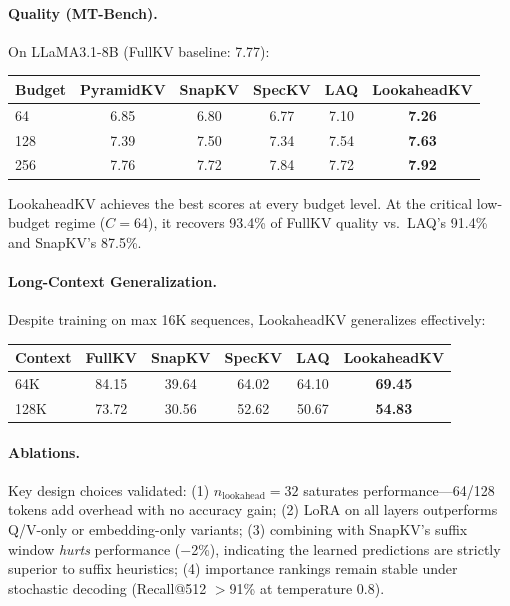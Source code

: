 \documentclass[11pt]{article}
\begin{document}
\paragraph{Quality (MT-Bench).}
On LLaMA3.1-8B (FullKV baseline: 7.77):

\begin{center}
\begin{tabular}{lccccc}
\toprule
\textbf{Budget} & \textbf{PyramidKV} & \textbf{SnapKV} & \textbf{SpecKV} & \textbf{LAQ} & \textbf{LookaheadKV} \\
\midrule
64 & 6.85 & 6.80 & 6.77 & 7.10 & \textbf{7.26} \\
128 & 7.39 & 7.50 & 7.34 & 7.54 & \textbf{7.63} \\
256 & 7.76 & 7.72 & 7.84 & 7.72 & \textbf{7.92} \\
\bottomrule
\end{tabular}
\end{center}

LookaheadKV achieves the best scores at every budget level. At the critical low-budget regime ($C\!=\!64$), it recovers 93.4\% of FullKV quality vs.\ LAQ's 91.4\% and SnapKV's 87.5\%.

\paragraph{Long-Context Generalization.}
Despite training on max 16K sequences, LookaheadKV generalizes effectively:

\begin{center}
\begin{tabular}{lccccc}
\toprule
\textbf{Context} & \textbf{FullKV} & \textbf{SnapKV} & \textbf{SpecKV} & \textbf{LAQ} & \textbf{LookaheadKV} \\
\midrule
64K & 84.15 & 39.64 & 64.02 & 64.10 & \textbf{69.45} \\
128K & 73.72 & 30.56 & 52.62 & 50.67 & \textbf{54.83} \\
\bottomrule
\end{tabular}
\end{center}

\paragraph{Ablations.}
Key design choices validated: (1) $n_{\mathrm{lookahead}}=32$ saturates performance---64/128 tokens add overhead with no accuracy gain; (2) LoRA on all layers outperforms Q/V-only or embedding-only variants; (3) combining with SnapKV's suffix window \emph{hurts} performance ($-$2\%), indicating the learned predictions are strictly superior to suffix heuristics; (4) importance rankings remain stable under stochastic decoding (Recall@512 $>$91\% at temperature 0.8).
\end{document}
